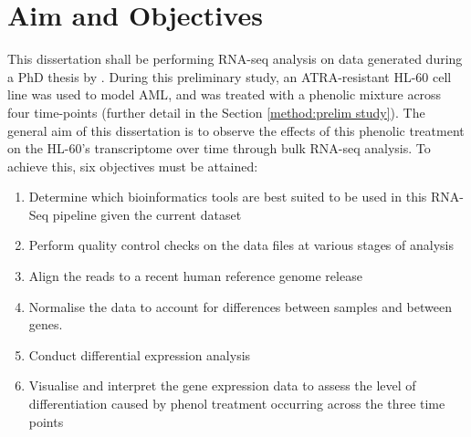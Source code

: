 \section{Aim and Objectives} 
\label{Aim and Objectives}
This dissertation shall be performing RNA-seq analysis on data generated during a PhD thesis by \cite{Gatt2016}. During this preliminary study, an \ac{ATRA}-resistant HL-60 cell line was used to model \ac{AML}, and was treated with a phenolic mixture across four time-points (further detail in the Section \ref{method:prelim study}). The general aim of this dissertation is to observe the effects of this phenolic treatment on the HL-60’s transcriptome over time through bulk RNA-seq analysis. To achieve this, six objectives must be attained:

\begin{enumerate}
\item Determine which bioinformatics tools are best suited to be used in this RNA-Seq pipeline given the current dataset
\item Perform quality control checks on the data files at various stages of analysis
\item Align the reads to a recent human reference genome release
\item Normalise the data to account for differences between samples and between genes.
\item Conduct differential expression analysis
\item Visualise and interpret the gene expression data to assess the level of differentiation caused by phenol treatment occurring across the three time points
\end{enumerate}




